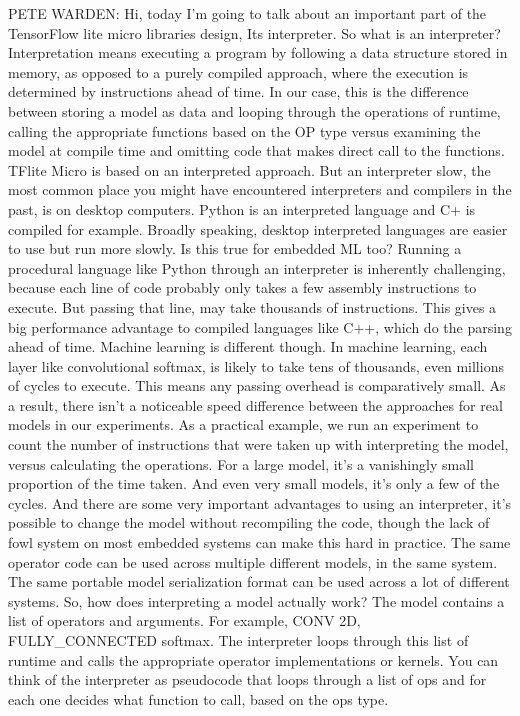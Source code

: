     PETE WARDEN: Hi, today I'm going to talk about an important part
    of the TensorFlow lite micro libraries design, Its interpreter.
    So what is an interpreter?
    Interpretation means executing a program by following a data structure stored
    in memory, as opposed to a purely compiled approach,
    where the execution is determined by instructions ahead of time.
    In our case, this is the difference between storing a model as data
    and looping through the operations of runtime,
    calling the appropriate functions based on the OP type versus examining
    the model at compile time and omitting code that
    makes direct call to the functions.
    TFlite Micro is based on an interpreted approach.
    But an interpreter slow, the most common place
    you might have encountered interpreters and compilers in the past,
    is on desktop computers.
    Python is an interpreted language and C+ is compiled for example.
    Broadly speaking, desktop interpreted languages are easier to use
    but run more slowly.
    Is this true for embedded ML too?
    Running a procedural language like Python through an interpreter
    is inherently challenging, because each line of code
    probably only takes a few assembly instructions to execute.
    But passing that line, may take thousands of instructions.
    This gives a big performance advantage to compiled languages like C++,
    which do the parsing ahead of time.
    Machine learning is different though.
    In machine learning, each layer like convolutional softmax,
    is likely to take tens of thousands, even millions of cycles to execute.
    This means any passing overhead is comparatively small.
    As a result, there isn't a noticeable speed difference between the approaches
    for real models in our experiments.
    As a practical example, we run an experiment
    to count the number of instructions that were taken up
    with interpreting the model, versus calculating the operations.
    For a large model, it's a vanishingly small proportion of the time taken.
    And even very small models, it's only a few of the cycles.
    And there are some very important advantages to using an interpreter,
    it's possible to change the model without recompiling the code,
    though the lack of fowl system on most embedded systems
    can make this hard in practice.
    The same operator code can be used across multiple different models,
    in the same system.
    The same portable model serialization format
    can be used across a lot of different systems.
    So, how does interpreting a model actually work?
    The model contains a list of operators and arguments.
    For example, CONV 2D, FULLY\_CONNECTED softmax.
    The interpreter loops through this list of runtime
    and calls the appropriate operator implementations or kernels.
    You can think of the interpreter as pseudocode
    that loops through a list of ops and for each one decides what function to call,
    based on the ops type.

